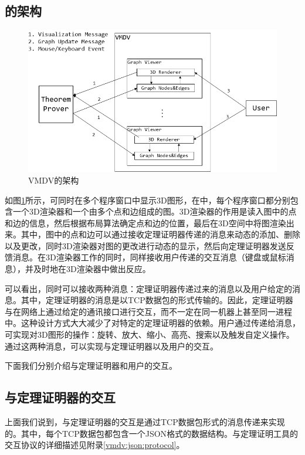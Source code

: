 \subsection{的架构}
\begin{figure}[!h]
	\scriptsize
	
	\centering
	\caption{\textsf{VMDV}的架构}
	\label{fig:architecture}
	\includegraphics[width=12cm]{./Img/architecture.png}
	
\end{figure}
如图\ref{fig:architecture}所示，可同时在多个程序窗口中显示3D图形，在中，每个程序窗口都分别包含一个3D渲染器和一个由多个点和边组成的图。3D渲染器的作用是读入图中的点和边的信息，然后根据布局算法确定点和边的位置，最后在3D空间中将图渲染出来。其中，图中的点和边可以通过接收定理证明器传递的消息来动态的添加、删除以及更改，同时3D渲染器对图的更改进行动态的显示，然后向定理证明器发送反馈消息。在3D渲染器工作的同时，同样接收用户传递的交互消息（键盘或鼠标消息），并及时地在3D渲染器中做出反应。

可以看出，同时可以接收两种消息：定理证明器传递过来的消息以及用户给定的消息。其中，定理证明器的消息是以\textsf{TCP}数据包的形式传输的。因此，定理证明器与在网络上通过给定的通讯接口进行交互，而不一定在同一机器上甚至同一进程中。这种设计方式大大减少了对特定的定理证明器的依赖。用户通过传递给消息，可实现对3D图形的操作：旋转、放大、缩小、高亮、搜索以及触发自定义操作。通过这两种消息，可以实现与定理证明器以及用户的交互。

下面我们分别介绍与定理证明器和用户的交互。
\subsection{与定理证明器的交互}
上面我们说到，与定理证明器的交互是通过\textsf{TCP}数据包形式的消息传递来实现的。其中，每个\textsf{TCP}数据包都包含一个\textsf{JSON}格式的数据结构。与定理证明工具的交互协议的详细描述见附录\ref{vmdv:json:protocol}。

